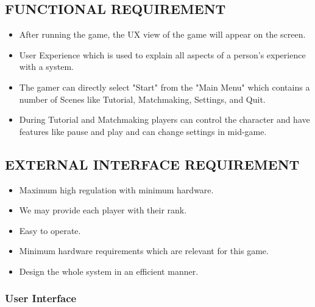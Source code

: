 \documentclass[12pt]{report}
\begin{document}

\centering
\raggedright
\subsection{ FUNCTIONAL REQUIREMENT}

\justifying
\setlength{\parindent}{4em}
\setlength{\parskip}{0.5em}
\renewcommand{\baselinestretch}{1.5}

\begin{itemize}\item After running the game, the UX view of the game will appear on the screen.
\item User Experience which is used to explain all aspects of a person's experience with a system.
\item The gamer can directly select "Start" from the "Main Menu"  which contains a number of Scenes like Tutorial, Matchmaking, Settings, and Quit.
\item During Tutorial and Matchmaking players can control the character and have features like pause and play and can change settings in mid-game.

\end{itemize}
\centering
\raggedright
\subsection{ EXTERNAL INTERFACE REQUIREMENT}

\justifying
\setlength{\parindent}{4em}
\setlength{\parskip}{0.5em}
\renewcommand{\baselinestretch}{1.5}
\normalsize\begin{itemize}\item  Maximum high regulation with minimum hardware.
\item We may provide each player with their rank.
\item Easy to operate.
\item Minimum hardware requirements which are relevant for this game.
\item Design the whole system in an efficient manner.
\end{itemize}
\subsubsection{ User Interface}
\end{document}
